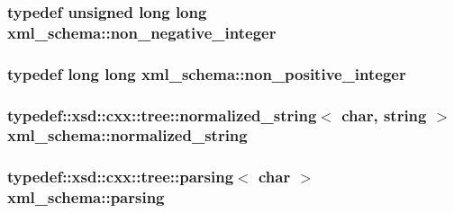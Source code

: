 \subsubsection[{\texorpdfstring{non\+\_\+negative\+\_\+integer}{non_negative_integer}}]{\setlength{\rightskip}{0pt plus 5cm}typedef unsigned long long {\bf xml\+\_\+schema\+::non\+\_\+negative\+\_\+integer}}\hypertarget{namespacexml__schema_af42ef5911d65f41a0a03598b056f05aa}{}\label{namespacexml__schema_af42ef5911d65f41a0a03598b056f05aa}
\subsubsection[{\texorpdfstring{non\+\_\+positive\+\_\+integer}{non_positive_integer}}]{\setlength{\rightskip}{0pt plus 5cm}typedef long long {\bf xml\+\_\+schema\+::non\+\_\+positive\+\_\+integer}}\hypertarget{namespacexml__schema_a3de6073e510eb8edd71ddc6e0256e2f9}{}\label{namespacexml__schema_a3de6073e510eb8edd71ddc6e0256e2f9}
\subsubsection[{\texorpdfstring{normalized\+\_\+string}{normalized_string}}]{\setlength{\rightskip}{0pt plus 5cm}typedef\+::xsd\+::cxx\+::tree\+::normalized\+\_\+string$<$ char, {\bf string} $>$ {\bf xml\+\_\+schema\+::normalized\+\_\+string}}\hypertarget{namespacexml__schema_a72078e45c15d8879c64071dea056f60c}{}\label{namespacexml__schema_a72078e45c15d8879c64071dea056f60c}
\subsubsection[{\texorpdfstring{parsing}{parsing}}]{\setlength{\rightskip}{0pt plus 5cm}typedef\+::xsd\+::cxx\+::tree\+::parsing$<$ char $>$ {\bf xml\+\_\+schema\+::parsing}}\hypertarget{namespacexml__schema_afbb8ed049be1751901785a29a6d13942}{}\label{namespacexml__schema_afbb8ed049be1751901785a29a6d13942}
